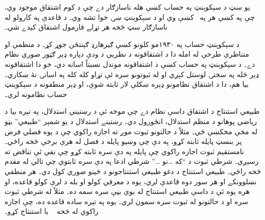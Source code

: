 \documentclass[12pt,a4paper,oneside]{report}
\newcommand{\olfileid}[3]{\gdef\pspart{#1}\gdef\pschapter{#2}\gdef\pssection{#3}}
\gdef\pspart{#2}\gdef\pschapter{#3}\gdef\pssection{}%
\theoremstyle{definition}
\begin{document}
\label{olpseg:OLP-0065-B008:start}
يو سټ \LR{$\Gamma$} د سېکوېنټ په حساب کښې هله ناسازګار دے چې د
\LR{$\Gamma_0 \Sequent$} کوم اشتقاق موجود وي، چې په کښې هر
 په~\LR{$\Gamma$} کښې وي او د سېکوېنټ ښۍ خوا تشه وي۔
د \RightR{\Weakening} قاعدې په کارولو له ناسازګار سټ څخه هر
تړلے فارمول اشتقاق کېدے شي۔
\label{olpseg:OLP-0065-B008:end}

\label{olpseg:OLP-0065-B009:start}
د سېکوېنټ حساب په ۱۹۳۰مو کلونو کښې ګيرهارډ ګېنتڅن جوړ کړ۔ د منظمې
او متناظرې طرحې له امله دا د اشتقاقونه د نظريې د ودې دپاره
ډېر ګټور صوري نظام دے۔ د سېکوېنټ په حساب کښې د اشتقاقونه
موندل نسبتاً اسانه دي، خو دا اشتقاقونه ډېر ځله په سختۍ لوستل
کېږي او له ثبوتونو سره ئې تړاو کله کله په اسانۍ نۀ ښکاري۔ بيا هم،
دا د اشتقاق نظامونو ډېره ښکلې لار ثابته شوې، او ډېر منطقونه
د سېکوېنټ حساب نظامونه لري۔
\label{olpseg:OLP-0065-B009:end}

\label{olpseg:OLP-0066-B004:start}
\olfileid{fol}{prf}{ntd}
\label{olpseg:OLP-0066-B004:end}

\label{olpseg:OLP-0066-B005:start}
\label{olpseg:OLP-0066-B005:end}

\label{olpseg:OLP-0066-B006:start}
طبيعي استنتاج د اشتقاق داسې نظام دے چې موخه ئې د رښتيني
استدلال، په تېره بيا د رياضي پوهانو د منظم استدلال، انځورول دي۔
رښتينے استدلال د يو شمېر ``طبيعي'' بڼو له مخې مخکښې ځي۔ مثلاً د
حالتونو ثبوت موږ ته اجازه راکوي چې د يوه فصلي فرض پر بنسټ پايله
ثابته کړو، په دې چې وښيو پايله د فصل له هرې برخې څخه راځي۔ نامستقيم
ثبوت اجازه راکوي چې پايله په دې سره ثابته کړو چې نفي ئې تناقض ته
رسېږي۔ شرطي ثبوت د ``که \dots نو \dots'' شرطي ادعا په دې سره ثابتوي
چې تالي له مقدم څخه راځي۔ طبيعي استنتاج د دغو طبيعي استنتاجونو د
ځينو صوري کول دي۔ هر منطقي نښلوونکے او هر سور دوه قاعدې لري، يوه د
معرفي کولو او بله د لرې کولو قاعده، او هره يوه ئې د داسې طبيعي
استنتاج له يوې بڼې سره سمه ده۔ مثلاً \LR{$\Intro{\lif}$} له شرطي ثبوت
سره او \LR{$\Elim{\lor}$} د حالتونو له ثبوت سره سمون لري۔ يوه په تېره
ساده قاعده \LR{$\Elim{\land}$} ده، چې اجازه راکوي له  څخه
~ يا  استنتاج کړو۔
\label{olpseg:OLP-0066-B006:end}
\end{document}
